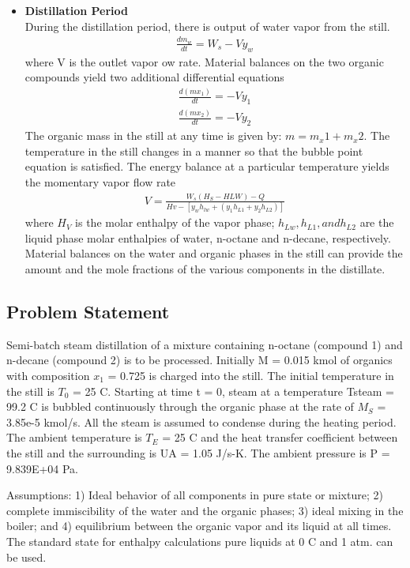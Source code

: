 \documentclass[12pt]{report}
\begin{document}
\begin{itemize}
\item{\textbf{Distillation Period}} \\
During the distillation period, there is output of water vapor from the still. 
\begin{gather*}
\frac{dm_w}{dt} = W_s - Vy_w
\end{gather*}
where V is the outlet vapor  ow rate. Material balances on the two organic compounds yield two additional differential equations
\begin{gather*}
\frac{d(mx_1)}{dt} = -Vy_1 \\
\frac{d(mx_2)}{dt} = -Vy_2
\end{gather*}
The organic mass in the still at any time is given by: $m = m_x1 + m_x2$. The temperature in the still changes in a manner so that the bubble point equation is satisfied. The energy balance at a particular temperature yields the momentary vapor flow rate
\begin{gather*}
V = \frac{W_s(H_S-H{LW}) - Q}{Hv-[y_wh_{lw}+(y_1h_{L1}+y_2h_{L2})]}
\end{gather*}
where $H_V$ is the molar enthalpy of the vapor phase; $h_{Lw}, h_{L1}, and h_{L2}$ are the liquid phase molar enthalpies of water, n-octane and n-decane, respectively. Material balances on the water and organic phases in the still can provide the amount and the mole fractions of the various components in the distillate.
\end{itemize}

\subsection{Problem Statement} 
Semi-batch steam distillation of a mixture containing n-octane (compound 1) and n-decane (compound 2) is to be processed. Initially M = 0.015 kmol of organics with
composition $x_1$ = 0.725 is charged into the still. The initial temperature in the still is $T_0$ = 25 \degree C. Starting at time t = 0, steam at a temperature Tsteam = 99.2 \degree C is bubbled continuously through the organic phase at the rate of $M_S$ = 3.85e-5 kmol/s. All the steam is assumed to condense during the heating period. The ambient temperature is $T_E$ = 25 \degree C and the heat transfer coefficient between the still and the surrounding is UA = 1.05 J/s-K. The ambient pressure is P = 9.839E+04 Pa.

Assumptions: 1) Ideal behavior of all components in pure state or mixture; 2) complete immiscibility of the water and the organic phases; 3) ideal mixing in the boiler; and 4) equilibrium between the organic vapor and its liquid at all times. The standard state for enthalpy calculations pure liquids at 0 \degree C and 1 atm. can be used.
\end{document}
